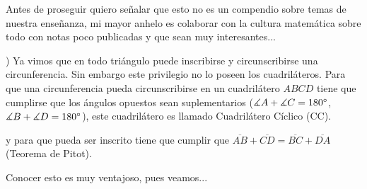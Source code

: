 Antes de proseguir quiero señalar que esto no es un compendio sobre temas de nuestra enseñanza, mi mayor anhelo es colaborar con la cultura matemática sobre todo con notas poco publicadas y que sean muy interesantes...

\vspace{0.5cm}
) Ya vimos que en todo triángulo puede inscribirse y circunscribirse una circunferencia. Sin embargo este privilegio no lo poseen los cuadriláteros. Para que una circunferencia pueda circunscribirse en un cuadrilátero $ABCD$ tiene que cumplirse que los ángulos opuestos sean suplementarios ($\measuredangle A + \measuredangle C = 180\degree$, $\measuredangle B + \measuredangle D = 180\degree$), este cuadrilátero es llamado Cuadrilátero Cíclico (CC).

\hspace{2cm} y para que pueda ser inscrito tiene que cumplir que $\overline{AB}+\overline{CD} = \overline{BC}+\overline{DA}$ (Teorema de Pitot).

\vspace{0.5cm}
Conocer esto es muy ventajoso, pues veamos...

